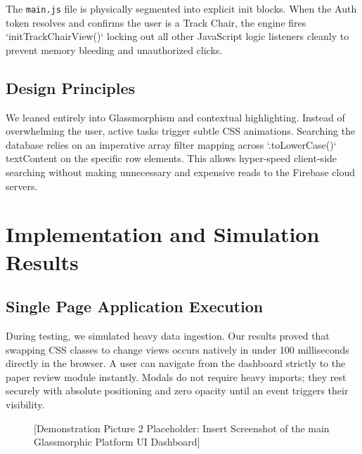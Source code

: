 \documentclass[12pt,a4paper]{report}
\begin{document}
The \texttt{main.js} file is physically segmented into explicit init blocks. When the Auth token resolves and confirms the user is a Track Chair, the engine fires `initTrackChairView()` locking out all other JavaScript logic listeners cleanly to prevent memory bleeding and unauthorized clicks.

\section{Design Principles}
We leaned entirely into Glassmorphism and contextual highlighting. Instead of overwhelming the user, active tasks trigger subtle CSS animations. Searching the database relies on an imperative array filter mapping across `.toLowerCase()` textContent on the specific row elements. This allows hyper-speed client-side searching without making unnecessary and expensive reads to the Firebase cloud servers.

\chapter{Implementation and Simulation Results}

\section{Single Page Application Execution}
During testing, we simulated heavy data ingestion. Our results proved that swapping CSS classes to change views occurs natively in under 100 milliseconds directly in the browser. A user can navigate from the dashboard strictly to the paper review module instantly. Modals do not require heavy imports; they rest securely with absolute positioning and zero opacity until an event triggers their visibility.

\begin{figure}[htbp]
    \centering
    \vspace{5cm}
    \caption{[Demonstration Picture 2 Placeholder: Insert Screenshot of the main Glassmorphic Platform UI Dashboard]}
    \label{fig:dashboard}
\end{figure}
\end{document}
